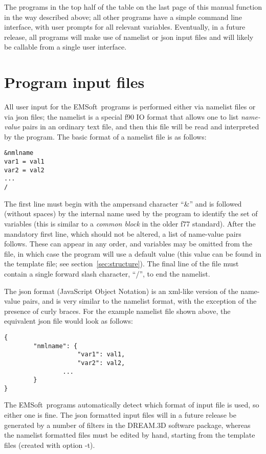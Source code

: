 \documentclass[DIV=calc, paper=letter, fontsize=11pt]{scrartcl}	 %
\newcommand{\ctp}{\textsf{EMSoft}}
\begin{document}
The programs in the top half of the table on the last page of this manual function in the way described above; all other programs
have a simple command line interface, with user prompts for all relevant variables.  Eventually, in a future release, all programs
will make use of namelist or json input files and will likely be callable from a single user interface.


\newpage
\section{Program input files\label{sec:f90input}}
All user input for the \ctp\ programs is performed either via namelist files or via json files; the namelist is a special f90 IO format that allows one to list 
\textit{name-value} pairs in an ordinary text file, and then this file will be read and interpreted by the 
program.  The basic format of a namelist file is as follows:
\begin{verbatim}
&nmlname
var1 = val1
var2 = val2
...
/
\end{verbatim}
The first line must begin with the ampersand character ``\&'' and is followed (without spaces) by the internal name used by the program 
to identify the set of variables (this is similar to a \textit{common block} in the older f77 standard).  After the mandatory first line, which should not be altered, a 
list of name-value pairs follows.  These can appear in any order, and variables may be omitted from the file, in which case the program
will use a default value (this value can be found in the template file; see section~\ref{sec:structure}).  The final line of the file must contain a single forward slash
character, ``/'', to end the namelist.

The json format (JavaScript Object Notation) is an xml-like version of the name-value pairs, and is very similar to the namelist format, with the exception 
of the presence of curly braces.  For the example namelist file shown above, the equivalent json file would look as follows:
\begin{verbatim}
{
        "nmlname": {
        	        "var1": val1,
        	        "var2": val2,
                ...		
        }
}
\end{verbatim}
The \ctp\ programs automatically detect which format of input file is used, so either one is fine.  The json formatted input files 
will in a future release be generated by a number of filters in the \textsf{DREAM.3D} software package, whereas the namelist formatted 
files must be edited by hand, starting from the template files (created with option -t).\\
\end{document}
